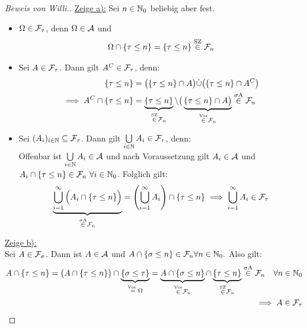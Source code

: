 \documentclass[12pt,a4paper]{article}
\begin{document}
\begin{proof}[Beweis von Willi.]\enter
\underline{Zeige a):} Sei $n\in\mathbb{N}_0$ beliebig aber fest.
\begin{itemize} 
\item $\Omega\in\mathcal{F}_\tau$, denn $\Omega\in\mathcal{A}$ und 
\begin{align*}
\Omega\cap\lbrace\tau\leq n\rbrace=\lbrace\tau\leq n\rbrace \stackrel{\text{SZ}}{\in} \mathcal{F}_n
\end{align*}
\item Sei $A \in \mathcal{F}_\tau$. Dann gilt $A^C \in \mathcal{F}_\tau$, denn:\\
\begin{align*}
\lbrace\tau\leq n\rbrace &=\big(\lbrace\tau\leq n\rbrace\cap A\big)\dot{\cup}\big(\lbrace\tau\leq n\rbrace\cap A^C\big)\\
\implies A^C\cap\lbrace\tau\leq n\rbrace&=\underbrace{\lbrace\tau\leq n\rbrace}_{\stackrel{\text{SZ}}{\in}\mathcal{F}_n}\setminus\big(\underbrace{\lbrace\tau\leq n\rbrace\cap A\big)}_{\stackrel{\text{Vor}}{\in}\mathcal{F}_n}\stackrel{\sigma\text{A}}{\in}\mathcal{F}_n
\end{align*}

\item Sei $(A_i)_{i\in\mathbb{N}}\subseteq\mathcal{F}_\tau$. Dann gilt $\bigcup\limits_{i\in\mathbb{N}} A_i  \in \mathcal{F}_\tau$, denn:\\
Offenbar ist $\bigcup\limits_{i\in\mathbb{N}} A_i  \in\mathcal{A}$ und nach Voraussetzung gilt $A_i\in\mathcal{A}$ und\\ $A_i\cap\lbrace\tau\leq n\rbrace\in\mathcal{F}_n~\forall i\in\mathbb{N}_0$. Folglich gilt:
\begin{align*}
\underbrace{\bigcup\limits_{i=1}^{\infty} \Big (A_i \cap \{\tau \leq n\} \Big )}_{\stackrel{\sigma\text{A}}{\in} \mathcal{F}_n} = \left( \bigcup\limits_{i=1}^{\infty} A_i \right)\cap \{\tau \leq n\} \implies  \bigcup\limits_{i=1}^{\infty} A_i \in \mathcal{F}_\tau
\end{align*}
\end{itemize}

\underline{Zeige b):}\\
Sei $A\in\mathcal{F}_\sigma$. Dann ist $A\in\mathcal{A}$ und $A\cap\lbrace\sigma\leq n\rbrace\in\mathcal{F}_n\forall n\in\mathbb{N}_0.$ Also gilt:
\begin{align*}
A \cap \lbrace\tau \leq n\rbrace
\stackrel{}{=}
\big(A \cap\lbrace\tau \leq n\rbrace\big)\cap\underbrace{\lbrace\sigma\leq\tau\rbrace}_{\stackrel{\text{Vor.}}{=}\Omega}
=\underbrace{A\cap\lbrace\sigma\leq n\rbrace}_{\stackrel{\text{Vor}}{\in}\mathcal{F}_n}\cap\underbrace{\lbrace\tau\leq n\rbrace}_{\stackrel{\text{SZ}}{\in}\mathcal{F}_n} \stackrel{\sigma\text{A}}{\in} \mathcal{F}_n \quad \forall n \in \mathbb{N}_0\\
\implies A\in\mathcal{F}_\tau
\end{align*}


\end{proof}
\end{document}
